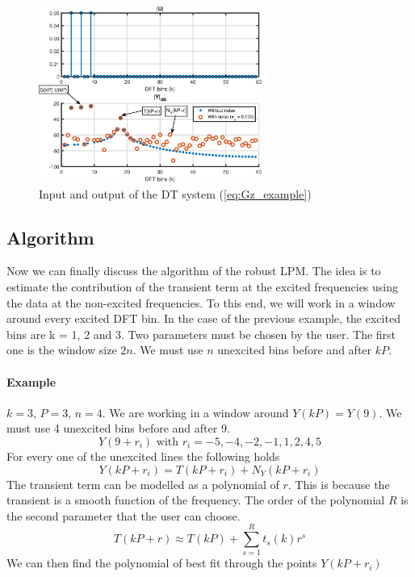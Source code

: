 \begin{figure}[H]
    \centering
    \includegraphics[width = 0.65\textwidth]{figures/periodic_output.eps}
    \caption{Input and output of the DT system (\ref{eq:Gz_example})}
    \label{fig:periodic_output}
\end{figure}

\subsection{Algorithm} Now we can finally discuss the algorithm of the robust LPM. The idea is to estimate the contribution of the transient term at the excited frequencies using the data at the non-excited frequencies. To this end, we will work in a window around every excited DFT bin. In the case of the previous example, the excited bins are k = 1, 2 and 3. Two parameters must be chosen by the user. The first one is the window size $2n$. We must use $n$ unexcited bins before and after $kP$. 

\paragraph{Example}
$k = 3$, $P=3$, $n=4$. We are working in a window around $Y(kP) = Y(9)$. We must use 4 unexcited bins before and after 9.
\begin{equation*}
    Y(9+r_i) \text{ with } r_i = -5,-4,-2,-1,1,2,4,5
\end{equation*}
For every one of the unexcited lines the following holds
\begin{equation*}
    Y(kP+r_i) = T(kP+r_i) + N_Y(kP+r_i)
\end{equation*}
The transient term can be modelled as a polynomial of $r$. This is because the transient is a smooth function of the frequency. The order of the polynomial $R$ is the second parameter that the user can choose.
\begin{equation*}
    T(kP+r) \approx T(kP) + \sum_{s=1}^R t_s(k) r^s
\end{equation*}
We can then find the polynomial of best fit through the points $Y(kP+r_i)$

